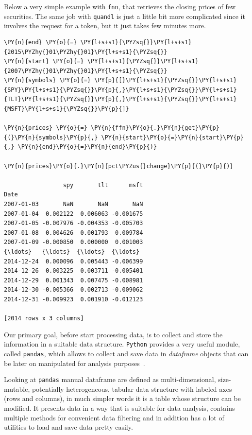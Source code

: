 Below a very simple example with \texttt{fnn}, that retrieves the closing prices of few securities. The same job with \texttt{quandl} is just a little bit 
more complicated since it involves the request for a token, but it just takes 
few minutes more.  
\begin{tcolorbox}[breakable, size=fbox, boxrule=1pt, pad at break*=1mm,colback=cellbackground, colframe=cellborder]
\begin{Verbatim}[commandchars=\\\{\}]
\PY{n}{end} \PY{o}{=} \PY{l+s+s1}{\PYZsq{}}\PY{l+s+s1}{2015\PYZhy{}01\PYZhy{}01}\PY{l+s+s1}{\PYZsq{}}
\PY{n}{start} \PY{o}{=} \PY{l+s+s1}{\PYZsq{}}\PY{l+s+s1}{2007\PYZhy{}01\PYZhy{}01}\PY{l+s+s1}{\PYZsq{}}
\PY{n}{symbols} \PY{o}{=} \PY{p}{[}\PY{l+s+s1}{\PYZsq{}}\PY{l+s+s1}{SPY}\PY{l+s+s1}{\PYZsq{}}\PY{p}{,}\PY{l+s+s1}{\PYZsq{}}\PY{l+s+s1}{TLT}\PY{l+s+s1}{\PYZsq{}}\PY{p}{,}\PY{l+s+s1}{\PYZsq{}}\PY{l+s+s1}{MSFT}\PY{l+s+s1}{\PYZsq{}}\PY{p}{]}

\PY{n}{prices} \PY{o}{=} \PY{n}{ffn}\PY{o}{.}\PY{n}{get}\PY{p}{(}\PY{n}{symbols}\PY{p}{,} \PY{n}{start}\PY{o}{=}\PY{n}{start}\PY{p}{,} \PY{n}{end}\PY{o}{=}\PY{n}{end}\PY{p}{)}

\PY{n}{prices}\PY{o}{.}\PY{n}{pct\PYZus{}change}\PY{p}{(}\PY{p}{)}

                 spy       tlt      msft
Date
2007-01-03       NaN       NaN       NaN
2007-01-04  0.002122  0.006063 -0.001675
2007-01-05 -0.007976 -0.004353 -0.005703
2007-01-08  0.004626  0.001793  0.009784
2007-01-09 -0.000850  0.000000  0.001003
{\ldots}   {\ldots}  {\ldots}  {\ldots}
2014-12-24  0.000096  0.005443 -0.006399
2014-12-26  0.003225  0.003711 -0.005401
2014-12-29  0.001343  0.007475 -0.008981
2014-12-30 -0.005366  0.002713 -0.009062
2014-12-31 -0.009923  0.001910 -0.012123
	
[2014 rows x 3 columns]
\end{Verbatim}
\end{tcolorbox}

Our primary goal, before start processing data, is to collect and store the information in a suitable data structure. \texttt{Python} provides a very useful module, called \texttt{pandas}, which allows to collect and save data in \emph{dataframe} objects that can be later on manipulated for analysis purposes~\cite{pandas}.

Looking at \texttt{pandas} manual dataframe are defined as multi-dimensional, size-mutable, potentially heterogeneous, tabular data structure with labeled axes (rows and columns), in much simpler words it is a table whose structure can be modified.
It presents data in a way that is suitable for data analysis, contains multiple methods for convenient data filtering and in addition has a lot of utilities to load and save data pretty easily.

